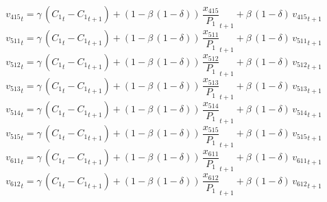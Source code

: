 \begin{dmath}
{{v_{415}}}_{t}={{\gamma}}\, \left({{C_{1}}}_{t}-{{C_{1}}}_{t+1}\right)+\left(1-{{\beta}}\, \left(1-{{\delta}}\right)\right)\, {{\frac{x_{415}}{P_{1}}}}_{t+1}+{{\beta}}\, \left(1-{{\delta}}\right)\, {{v_{415}}}_{t+1}
\end{dmath}
\begin{dmath}
{{v_{511}}}_{t}={{\gamma}}\, \left({{C_{1}}}_{t}-{{C_{1}}}_{t+1}\right)+\left(1-{{\beta}}\, \left(1-{{\delta}}\right)\right)\, {{\frac{x_{511}}{P_{1}}}}_{t+1}+{{\beta}}\, \left(1-{{\delta}}\right)\, {{v_{511}}}_{t+1}
\end{dmath}
\begin{dmath}
{{v_{512}}}_{t}={{\gamma}}\, \left({{C_{1}}}_{t}-{{C_{1}}}_{t+1}\right)+\left(1-{{\beta}}\, \left(1-{{\delta}}\right)\right)\, {{\frac{x_{512}}{P_{1}}}}_{t+1}+{{\beta}}\, \left(1-{{\delta}}\right)\, {{v_{512}}}_{t+1}
\end{dmath}
\begin{dmath}
{{v_{513}}}_{t}={{\gamma}}\, \left({{C_{1}}}_{t}-{{C_{1}}}_{t+1}\right)+\left(1-{{\beta}}\, \left(1-{{\delta}}\right)\right)\, {{\frac{x_{513}}{P_{1}}}}_{t+1}+{{\beta}}\, \left(1-{{\delta}}\right)\, {{v_{513}}}_{t+1}
\end{dmath}
\begin{dmath}
{{v_{514}}}_{t}={{\gamma}}\, \left({{C_{1}}}_{t}-{{C_{1}}}_{t+1}\right)+\left(1-{{\beta}}\, \left(1-{{\delta}}\right)\right)\, {{\frac{x_{514}}{P_{1}}}}_{t+1}+{{\beta}}\, \left(1-{{\delta}}\right)\, {{v_{514}}}_{t+1}
\end{dmath}
\begin{dmath}
{{v_{515}}}_{t}={{\gamma}}\, \left({{C_{1}}}_{t}-{{C_{1}}}_{t+1}\right)+\left(1-{{\beta}}\, \left(1-{{\delta}}\right)\right)\, {{\frac{x_{515}}{P_{1}}}}_{t+1}+{{\beta}}\, \left(1-{{\delta}}\right)\, {{v_{515}}}_{t+1}
\end{dmath}
\begin{dmath}
{{v_{611}}}_{t}={{\gamma}}\, \left({{C_{1}}}_{t}-{{C_{1}}}_{t+1}\right)+\left(1-{{\beta}}\, \left(1-{{\delta}}\right)\right)\, {{\frac{x_{611}}{P_{1}}}}_{t+1}+{{\beta}}\, \left(1-{{\delta}}\right)\, {{v_{611}}}_{t+1}
\end{dmath}
\begin{dmath}
{{v_{612}}}_{t}={{\gamma}}\, \left({{C_{1}}}_{t}-{{C_{1}}}_{t+1}\right)+\left(1-{{\beta}}\, \left(1-{{\delta}}\right)\right)\, {{\frac{x_{612}}{P_{1}}}}_{t+1}+{{\beta}}\, \left(1-{{\delta}}\right)\, {{v_{612}}}_{t+1}
\end{dmath}
